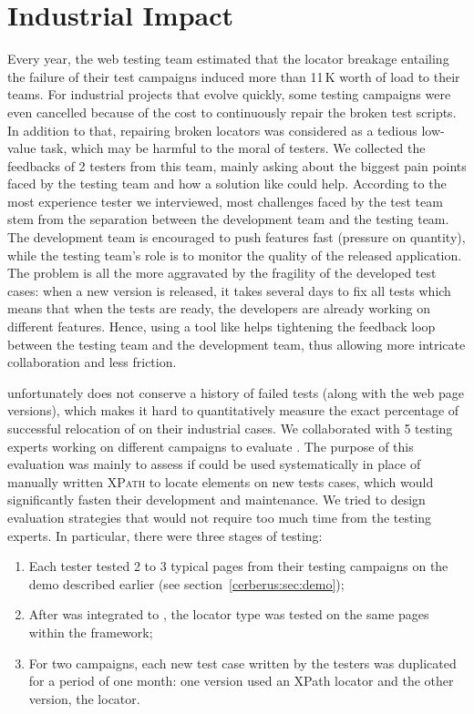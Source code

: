 \section{Industrial Impact}\label{cerberus:sec:impact}
Every year, the \laredoute{} web testing team estimated that the locator breakage entailing the failure of their test campaigns induced more than 11\,K\texteuro{} worth of load to their teams.
For industrial projects that evolve quickly, some testing campaigns were even cancelled because of the cost to continuously repair the broken test scripts.
In addition to that, repairing broken locators was considered as a tedious low-value task, which may be harmful to the moral of testers. 
We collected the feedbacks of 2 testers from this team, mainly asking about the biggest pain points faced by the testing team and how a solution like \erratum could help. 
According to the most experience tester we interviewed, most challenges faced by the test team stem from the separation between the development team and the testing team.
The development team is encouraged to push features fast (pressure on quantity), while the testing team's role is to monitor the quality of the released application.
The problem is all the more aggravated by the fragility of the developed test cases: when a new version is released, it takes several days to fix all tests which means that when the tests are ready, the developers are already working on different features.
Hence, using a tool like \erratum helps tightening the feedback loop between the testing team and the development team, thus allowing more intricate collaboration and less friction.

\laredoute{} unfortunately does not conserve a history of failed tests (along with the web page versions), which makes it hard to quantitatively measure the exact percentage of successful relocation of \erratum on their industrial cases.
We collaborated with 5 testing experts working on different campaigns to evaluate \erratum. 
The purpose of this evaluation was mainly to assess if \erratum could be used systematically in place of manually written \textsc{XPath} to locate elements on new tests cases, which would significantly fasten their development and maintenance.
We tried to design evaluation strategies that would not require too much time from the testing experts.
In particular, there were three stages of testing:
\begin{enumerate}
    \item Each tester tested 2 to 3 typical pages from their testing campaigns on the demo described earlier (see section~\ref{cerberus:sec:demo});
    \item After \erratum was integrated to \cerberus, the \erratum locator type was tested on the same pages within the \cerberus framework;
    \item For two campaigns, each new test case written by the testers was duplicated for a period of one month: one version used an XPath locator and the other version, the \erratum locator.
\end{enumerate}

